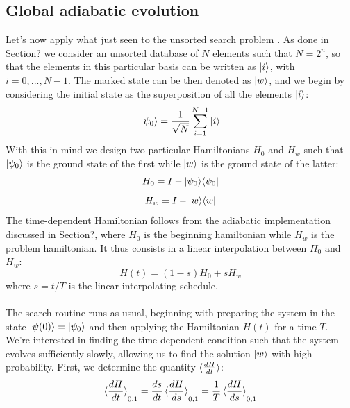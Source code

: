     \subsection{Global adiabatic evolution}
    Let's now apply what just seen to the unsorted search problem \cite{Roland2002}. As done in Section? we consider an unsorted database of $N$ elements such that $N=2^n$, so that the elements in this particular basis can be written as ${|{i}\rangle}$, with $i=0,...,N-1$. The marked state can be then denoted as ${|{w}\rangle}$, and we begin by considering the initial state as the superposition of all the elements ${|{i}\rangle}$:
    \begin{equation}
      {|{\psi_0}\rangle}=\frac{1}{\sqrt{N}}\sum_{i=1}^{N-1}{|{i}\rangle}
    \end{equation}
    With this in mind we design two particular Hamiltonians $H_0$ and $H_w$ such that ${|{\psi_0}\rangle}$ is the ground state of the first while ${|{w}\rangle}$ is the ground state of the latter:
    \begin{equation}
      H_0 = I- {|{\psi_0}\rangle}{\langle{\psi_0}|}
      \label{eq:adiabatic_ground}
    \end{equation}
    \vspace{-1cm}
    \begin{equation}
      H_w = I- {|{w}\rangle}{\langle{w}|}
      \label{eq:adiabatic_first}
    \end{equation}
    The time-dependent Hamiltonian follows from the adiabatic implementation discussed in Section?, where $H_0$ is the beginning hamiltonian while $H_w$ is the problem hamiltonian. It thus consists in a linear interpolation between $H_0$ and $H_w$:
    \begin{equation}
      H(t) = (1-s)H_0 + sH_w
    \end{equation}
    where $s=t/T$ is the linear interpolating schedule.\\ \\
    The search routine runs as usual, beginning with preparing the system in the state ${|{\psi(0)}\rangle}={|{\psi_0}\rangle}$ and then applying the Hamiltonian $H(t)$ for a time $T$. We're interested in finding the time-dependent condition such that the system evolves sufficiently slowly, allowing us to find the solution ${|{w}\rangle}$ with high probability. First, we determine the quantity $\braket{\frac{dH}{dt}}$:
    \begin{equation}
      \braket{\frac{dH}{dt}}_{0,1} = \frac{ds}{dt}\braket{\frac{dH}{ds}}_{0,1} = \frac{1}{T}\braket{\frac{dH}{ds}}_{0,1}
    \end{equation}
